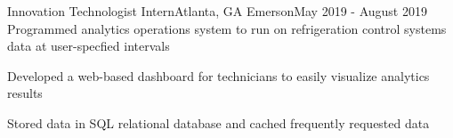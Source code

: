 \resumeSubheading
{Innovation Technologist Intern}{Atlanta, GA}
{Emerson}{May 2019 - August 2019}
\resumeItemListStart
\resumeItem
{
    Programmed analytics operations system to run on refrigeration control systems data at
    user-specfied intervals
}

\resumeItem
{
    Developed a web-based dashboard for technicians to easily visualize analytics results
}

\resumeItem
{
    Stored data in SQL relational database and cached frequently requested data
}
\resumeItemListEnd

